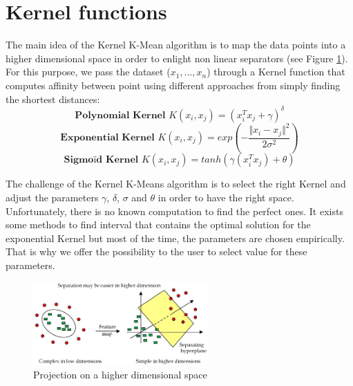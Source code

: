 \section{Kernel functions}
The main idea of the Kernel K-Mean algorithm is to map the data points into a higher dimensional space in order to enlight non linear separators (see Figure \ref{kern}). For this purpose, we pass the dataset ($x_1,...,x_n$) through a Kernel function that computes affinity between point using different approaches from simply finding the shortest distances:\\
\begin{equation}
\textbf{Polynomial Kernel }K(x_i,x_j) = (x_i^Tx_j + \gamma)^{\delta}
\end{equation}
\begin{equation}
\textbf{Exponential Kernel }K(x_i,x_j) = exp(-\frac{\Vert x_i-x_j\Vert^2}{2\sigma^2})
\end{equation}
\begin{equation}
\textbf{Sigmoïd Kernel }K(x_i,x_j) = tanh(\gamma (x_i^Tx_j) + \theta)
\end{equation}

The challenge of the Kernel K-Means algorithm is to select the right Kernel and adjust the parameters $\gamma$, $\delta$, $\sigma$ and $\theta$ in order to have the right space. Unfortunately, there is no known computation to find the perfect ones. It exists some methods to find interval that contains the optimal solution for the exponential Kernel but most of the time, the parameters are chosen empirically. That is why we offer the possibility to the user to select value for these parameters.
\begin{figure}[h!]
\includegraphics[width=0.6\textwidth]{Image/algo-kern.png}\centering
\caption{Projection on a higher dimensional space\label{kern}}
\end{figure}
